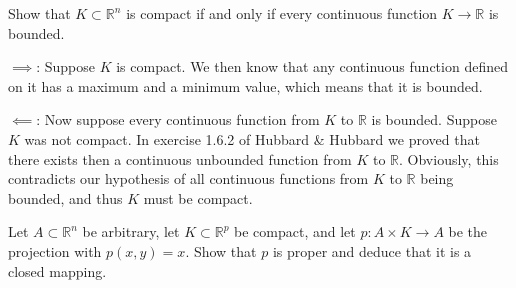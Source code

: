 \begin{exercise}{22}
    Show that $K \subset \mathbb{R}^n$ is compact if and only if every continuous function $K \rightarrow \mathbb{R}$ is bounded.
\end{exercise}

\begin{solution}

    $\implies$: Suppose $K$ is compact. We then know that any continuous function defined on it has a maximum and a minimum value, which means that it is bounded.

    $\impliedby$: Now suppose every continuous function from $K$ to $\mathbb{R}$ is bounded. Suppose $K$ was not compact. In exercise 1.6.2 of Hubbard \& Hubbard we proved that there exists then a continuous unbounded function from $K$ to $\mathbb{R}$. Obviously, this contradicts our hypothesis of all continuous functions from $K$ to $\mathbb{R}$ being bounded, and thus $K$ must be compact.
\end{solution}

\newpage

\begin{exercise}{23}
    Let $A \subset \mathbb{R}^n$ be arbitrary, let $K \subset \mathbb{R}^p$ be compact, and let $p: A \times K \rightarrow A$ be the projection with $p(x, y) = x$. Show that $p$ is proper and deduce that it is a closed mapping.
\end{exercise}

